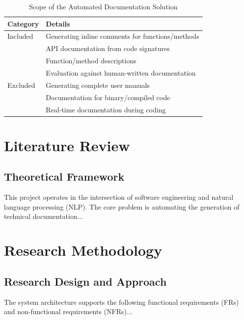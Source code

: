 \documentclass[12pt, a4paper]{report}
\begin{document}
\begin{table}[h]
    \centering
    \caption{Scope of the Automated Documentation Solution}
    \begin{tabular}{@{}lp{8cm}@{}}
        \toprule
        \textbf{Category} & \textbf{Details} \\
        \midrule
        Included & Generating inline comments for functions/methods \\
                 & API documentation from code signatures \\
                 & Function/method descriptions \\
                 & Evaluation against human-written documentation \\
        \midrule
        Excluded & Generating complete user manuals \\
                 & Documentation for binary/compiled code \\
                 & Real-time documentation during coding \\
        \bottomrule
    \end{tabular}
\end{table}

\chapter{Literature Review}

\section{Theoretical Framework}
This project operates in the intersection of software engineering and natural language processing (NLP). The core problem is automating the generation of technical documentation...

\chapter{Research Methodology}

\section{Research Design and Approach}
The system architecture supports the following functional requirements (FRs) and non-functional requirements (NFRs)...
\end{document}
